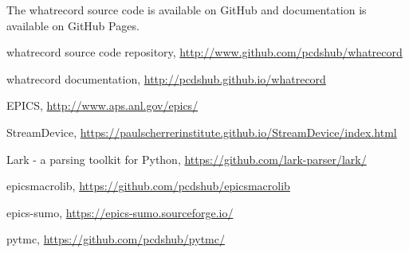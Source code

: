 \documentclass[letter,
               keeplastbox,   %
               ]{jacow}
\begin{document}
The whatrecord source code is available on GitHub\cite{whatrecord-github}
and documentation is available on GitHub Pages\cite{whatrecord-docs}.

%
%
%
	{\printbibliography}%
	{%
	
	\begin{thebibliography}{9} %
	
		whatrecord source code repository,
		\url{http://www.github.com/pcdshub/whatrecord}
	
		whatrecord documentation,
		\url{http://pcdshub.github.io/whatrecord}
	
		EPICS,
		\url{http://www.aps.anl.gov/epics/}
	
		StreamDevice,
		\url{https://paulscherrerinstitute.github.io/StreamDevice/index.html}
	
		Lark - a parsing toolkit for Python,
		\url{https://github.com/lark-parser/lark/}
	
		epicsmacrolib,
		\url{https://github.com/pcdshub/epicsmacrolib}
	
		epics-sumo,
		\url{https://epics-sumo.sourceforge.io/}
	
		pytmc,
		\url{https://github.com/pcdshub/pytmc/}
	
	\end{thebibliography}
} %

%
% 

\end{document}
